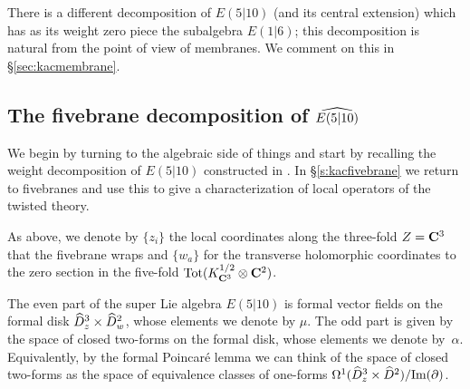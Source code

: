 \documentclass[11pt]{amsart}
\begin{document}
There is a different decomposition of $E(5|10)$ (and its central extension) which has as its weight zero piece the subalgebra $E(1|6)$; this decomposition is natural from the point of view of membranes.
We comment on this in \S \ref{sec:kacmembrane}.

\subsection{The fivebrane decomposition of $\Hat{E(5|10)}$}


We begin by turning to the algebraic side of things and start by recalling the weight decomposition of $E(5|10)$ constructed in \cite{KR2}.
In \S \ref{s:kacfivebrane} we return to fivebranes and use this to give a  characterization of local operators of the twisted theory.

\parsec[s:e510weight]

As above, we denote by $\{z_i\}$ the local coordinates along the three-fold $Z=\C^3$ that the fivebrane wraps and $\{w_a\}$ for the transverse holomorphic coordinates to the zero section in the five-fold ${\rm Tot}(K_{\C^3}^{1/2} \otimes \C^2)$.

The even part of the super Lie algebra $E(5|10)$ is formal vector fields on the formal disk $\Hat{D}^3_z \times \Hat{D}^2_w$, whose elements we denote by $\mu$. 
The odd part is given by the space of closed two-forms on the formal disk, whose elements we denote by~$\alpha$.
Equivalently, by the formal Poincar\'e lemma we can think of the space of closed two-forms as the space of equivalence classes of one-forms $\Omega^1(\Hat{D}^3_z \times \Hat{D}^2) / \text{Im}(\del)$. 
\end{document}
